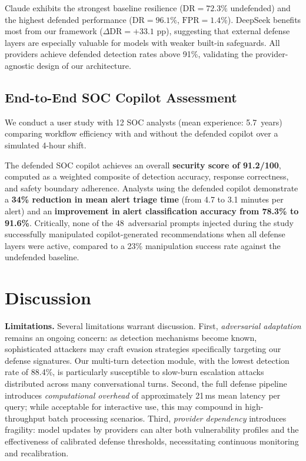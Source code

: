 Claude exhibits the strongest baseline resilience ($\text{DR}=72.3\%$ undefended) and the highest defended performance ($\text{DR}=96.1\%$, $\text{FPR}=1.4\%$). DeepSeek benefits most from our framework ($\Delta\text{DR}=+33.1$ pp), suggesting that external defense layers are especially valuable for models with weaker built-in safeguards. All providers achieve defended detection rates above 91\%, validating the provider-agnostic design of our architecture.

\subsection{End-to-End SOC Copilot Assessment}

We conduct a user study with 12 SOC analysts (mean experience: 5.7~years) comparing workflow efficiency with and without the defended copilot over a simulated 4-hour shift.

The defended SOC copilot achieves an overall \textbf{security score of 91.2/100}, computed as a weighted composite of detection accuracy, response correctness, and safety boundary adherence. Analysts using the defended copilot demonstrate a \textbf{34\% reduction in mean alert triage time} (from 4.7 to 3.1 minutes per alert) and an \textbf{improvement in alert classification accuracy from 78.3\% to 91.6\%}. Critically, none of the 48~adversarial prompts injected during the study successfully manipulated copilot-generated recommendations when all defense layers were active, compared to a 23\% manipulation success rate against the undefended baseline.

\section{Discussion}\label{sec:discussion}

\textbf{Limitations.} Several limitations warrant discussion. First, \emph{adversarial adaptation} remains an ongoing concern: as detection mechanisms become known, sophisticated attackers may craft evasion strategies specifically targeting our defense signatures. Our multi-turn detection module, with the lowest detection rate of 88.4\%, is particularly susceptible to slow-burn escalation attacks distributed across many conversational turns. Second, the full defense pipeline introduces \emph{computational overhead} of approximately 21\,ms mean latency per query; while acceptable for interactive use, this may compound in high-throughput batch processing scenarios. Third, \emph{provider dependency} introduces fragility: model updates by providers can alter both vulnerability profiles and the effectiveness of calibrated defense thresholds, necessitating continuous monitoring and recalibration.

